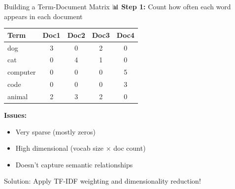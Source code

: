 \documentclass[aspectratio=169]{beamer}
\begin{document}
\begin{frame}{Building a Term-Document Matrix 📊}
\textbf{Step 1:} Count how often each word appears in each document

\vspace{1em}

\begin{center}
\begin{tabular}{l|cccc}
\toprule
\textbf{Term} & \textbf{Doc1} & \textbf{Doc2} & \textbf{Doc3} & \textbf{Doc4} \\
\midrule
dog & 3 & 0 & 2 & 0 \\
cat & 0 & 4 & 1 & 0 \\
computer & 0 & 0 & 0 & 5 \\
code & 0 & 0 & 0 & 3 \\
animal & 2 & 3 & 2 & 0 \\
\bottomrule
\end{tabular}
\end{center}

\vspace{1em}

\textbf{Issues:}
\begin{itemize}\setlength{\itemsep}{0pt}
    \item Very sparse (mostly zeros)
    \item High dimensional (vocab size × doc count)
    \item Doesn't capture semantic relationships
\end{itemize}

\pause
\vspace{0.5em}
\alert{Solution:} Apply TF-IDF weighting and dimensionality reduction!
\end{frame}
\end{document}
